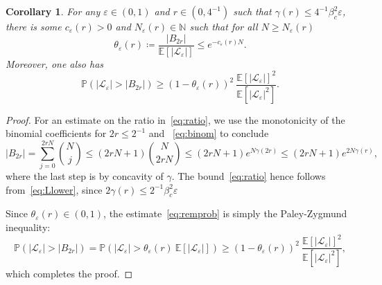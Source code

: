 \documentclass[letterpaper, DIV=17]{scrartcl}
\newtheorem{cor}[theorem]{Corollary}
\numberwithin{equation}{section}
\theoremstyle{definition}
\newcommand{\eps}{\varepsilon}
\begin{document}
\begin{cor}\label{cor:P1}
    For any $ \varepsilon \in (0,1) $ and $ r \in (0,4^{-1}) $ such that
    $
        \gamma(r) \leq 4^{-1} \beta_c^2  \varepsilon $, 
    there is some $ c_{\varepsilon}(r) > 0 $ and $ N_\varepsilon(r) \in \mathbb{N} $ such that for all $ N \geq N_\varepsilon(r) $ 
    \begin{equation}\label{eq:ratio}
    \theta_\varepsilon(r) \coloneqq \frac{|B_{2r}|}{\mathbb{E}\left[| \mathcal{L}_{\varepsilon}  | \right] } \leq e^{- c_{\varepsilon}(r) N } .
    \end{equation}
    Moreover, one also has
    \begin{equation}\label{eq:remprob}
        \mathbb{P}\left( |\mathcal{L}_\varepsilon | > |B_{2r}| \right) \geq \left(1-\theta_\varepsilon(r)\right)^2 \ \frac{\mathbb{E}\left[| \mathcal{L}_{\varepsilon}  | \right]^2 }{\mathbb{E}\left[| \mathcal{L}_{\varepsilon}  |^2 \right]} . 
    \end{equation}
\end{cor}
\begin{proof}
    For an estimate on the ratio in~\eqref{eq:ratio}, we use the monotonicity of the binomial coefficients for $ 2r \leq 2^{-1} $ and ~\eqref{eq:binom} to conclude
    $$
        |B_{2r}| = \sum_{j=0}^{2rN} \binom{N}{j} \leq (2rN+1) \binom{N}{2rN} \leq (2rN+1) e^{N\gamma(2r) } \leq (2rN+1) e^{2N \gamma(r)},
    $$
    where the last step is by concavity of $ \gamma $.
    The bound~\eqref{eq:ratio} hence follows from~\eqref{eq:Llower}, since $2\gamma(r)\leq 2^{-1}\beta_c^2\eps$

   Since $  \theta_\varepsilon(r) \in (0,1) $, the estimate~\eqref{eq:remprob} is simply the Paley-Zygmund inequality:
   $$
    \mathbb{P}\left( |\mathcal{L}_\varepsilon | > |B_{2r}| \right) = \mathbb{P}\left( |\mathcal{L}_\varepsilon | > \theta_\varepsilon(r) \ \mathbb{E}\left[| \mathcal{L}_{\varepsilon}  | \right]\right) \geq ( 1- \theta_\varepsilon(r) )^2 \  
    \frac{\mathbb{E}\left[| \mathcal{L}_{\varepsilon}  | \right]^2 }{\mathbb{E}\left[| \mathcal{L}_{\varepsilon}  |^2 \right]} , 
    $$
    which completes the proof.
\end{proof}
\end{document}
